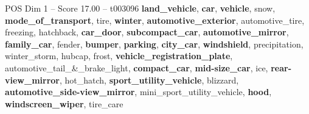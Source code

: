 \begin{textsample}{POS Dim 1 – Score 17.00 – t003096}  \label{ex:f1_pos_038}
\textbf{land\_vehicle}, \textbf{car}, \textbf{vehicle}, snow, \textbf{mode\_of\_transport}, tire, \textbf{winter}, \textbf{automotive\_exterior}, automotive\_tire, freezing, hatchback, \textbf{car\_door}, \textbf{subcompact\_car}, \textbf{automotive\_mirror}, \textbf{family\_car}, fender, \textbf{bumper}, \textbf{parking}, \textbf{city\_car}, \textbf{windshield}, precipitation, winter\_storm, hubcap, frost, \textbf{vehicle\_registration\_plate}, automotive\_tail\_\&\_brake\_light, \textbf{compact\_car}, \textbf{mid-size\_car}, ice, \textbf{rear-view\_mirror}, hot\_hatch, \textbf{sport\_utility\_vehicle}, blizzard, \textbf{automotive\_side-view\_mirror}, mini\_sport\_utility\_vehicle, \textbf{hood}, \textbf{windscreen\_wiper}, tire\_care

\end{textsample}
